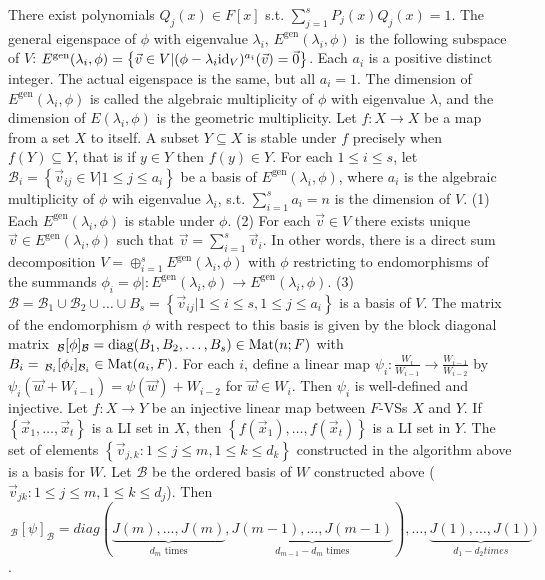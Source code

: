  There exist polynomials $Q_j(x) \in F[x]$ s.t. $\sum_{j=1}^sP_j(x)Q_j(x) = 1$.
 The general eigenspace of $\phi$ with eigenvalue $\lambda_i$, $E^{\mathrm{gen}}(\lambda_i, \phi)$ is the following subspace of $V$: $E^{\mathrm{gen}}(\lambda_i, \phi) = \left\{ \vec{v} \in V | (\phi - \lambda_i \text{id}_V)^{a_i}(\vec{v}) = \vec{0} \right\}$. Each $a_i$ is a positive distinct integer. The actual eigenspace is the same, but all $a_i=1$. The dimension of $E^\mathrm{gen} (\lambda_i, \phi)$ is called the algebraic multiplicity of $\phi$ with eigenvalue $\lambda$, and the dimension of $E(\lambda_i, \phi)$ is the geometric multiplicity. 
 Let $f : X \to X$ be a map from a set $X$ to itself. A subset $Y \subseteq X$ is stable under $f$ precisely when $f(Y) \subseteq Y$, that is if $y \in Y$ then $f(y) \in Y$.
 For each $1 \le i \le s$, let $\mathcal{B}_i = \left\{ \vec{v}_{ij} \in V | 1 \le j \le a_i \right\}$ be a basis of $E^{\mathrm{gen}}(\lambda_i, \phi)$, where $a_i$ is the algebraic multiplicity of $\phi$ wih eigenvalue $\lambda_i$, s.t. $\sum_{i=1}^s a_i = n$ is the dimension of $V$.
(1) Each $E^\mathrm{gen} (\lambda_i, \phi)$ is stable under $\phi$.
(2) For each $\vec{v} \in V$ there exists unique $\vec{v} \in E^\mathrm{gen} (\lambda_i, \phi)$ such that $\vec{v} = \sum_{i=1}^s \vec{v}_i$. In other words, there is a direct sum decomposition $V = \oplus_{i=1}^s E^\mathrm{gen} (\lambda_i, \phi)$ with $\phi$ restricting to endomorphisms of the summands $\phi_i = \phi| : E^\mathrm{gen} (\lambda_i, \phi) \to E^\mathrm{gen} (\lambda_i, \phi)$.
(3) $\mathcal{B} = \mathcal{B}_1 \cup \mathcal{B}_2 \cup \dots \cup B_s = \left\{ \vec{v}_{ij} | 1 \le i \le s, 1 \le j \le a_i \right\}$ is a basis of $V$. The matrix of the endomorphism $\phi$ with respect to this basis is given by the block diagonal matrix $\,_{\mathcal{B}}[\phi]_{\mathcal{B}} = \text{diag}(B_1, B_2, \dots, B_s) \in \text{Mat}(n; F)$ with $B_i = \,_{\mathcal{B}_i}[\phi_i]_{\mathcal{B}_i} \in \text{Mat}(a_i, F)$.
 For each $i$, define a linear map $\psi_i : \frac{W_i}{W_{i-1}} \to \frac{W_{i-1}}{W_{i-2}}$ by $\psi_i(\vec{w} + W_{i-1}) = \psi(\vec{w}) + W_{i-2}$ for $\vec{w} \in W_i$. Then $\psi_i$ is well-defined and injective.
 Let $f : X \to Y$ be an injective linear map between $F$-VSs $X$ and $Y$. If $\left\{ \vec{x}_1, \dots, \vec{x}_t \right\}$ is a LI set in $X$, then $\left\{ f(\vec{x}_1), \dots, f(\vec{x}_t) \right\}$ is a LI set in $Y$.
 The set of elements $\left\{ \vec{v}_{j,k} : 1 \le j \le m, 1 \le k \le d_k \right\}$ constructed in the algorithm above is a basis for $W$.
 Let $\mathcal{B}$ be the ordered basis of $W$ constructed above ($\vec{v}_{jk} : 1 \le j \le m, 1 \le k \le d_j$). Then
$\,_{\mathcal{B}}[\psi]_{\mathcal{B}} = diag(\underbrace{J(m), \dots, J(m)}_{\text{$d_m$ times}}, \underbrace{J(m-1), \dots, J(m-1)}_{\text{$d_{m-1}-d_m$ times}}), \dots, \underbrace{J(1), \dots, J(1)}_{\text{$d_1 - d_2$} times})$.